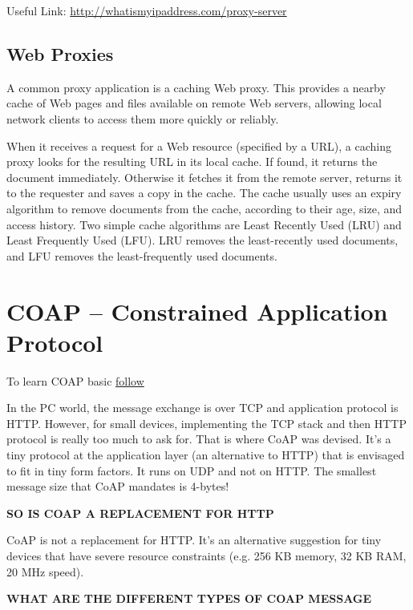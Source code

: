 \documentclass[letterpaper,10pt,english]{sphinxmanual}
\begin{document}
Useful Link: \href{http://whatismyipaddress.com/proxy-server}{http://whatismyipaddress.com/proxy-server}


\subsection{Web Proxies}
\label{week-10:web-proxies}
A common proxy application is a caching Web proxy. This provides a nearby cache of Web pages and files available on remote Web servers, allowing local network clients to access them more quickly or reliably.

When it receives a request for a Web resource (specified by a URL), a caching proxy looks for the resulting URL in its local cache. If found, it returns the document immediately. Otherwise it fetches it from the remote server, returns it to the requester and saves a copy in the cache. The cache usually uses an expiry algorithm to remove documents from the cache, according to their age, size, and access history. Two simple cache algorithms are Least Recently Used (LRU) and Least Frequently Used (LFU). LRU removes the least-recently used documents, and LFU removes the least-frequently used documents.


\section{COAP – Constrained Application Protocol}
\label{week-10:coap-constrained-application-protocol}
To learn COAP basic \href{http://www.coapsharp.com/basics-of-coap/}{follow}

In the PC world, the message exchange is over TCP and application protocol is HTTP. However, for small devices, implementing the TCP stack and then HTTP protocol is really too much to ask for. That is where CoAP was devised. It’s a tiny protocol at the application layer (an alternative to HTTP) that is envisaged to fit in tiny form factors. It runs on UDP and not on HTTP. The smallest message size that CoAP mandates is 4-bytes!

\textbf{SO IS COAP A REPLACEMENT FOR HTTP}

CoAP is not a replacement for HTTP. It’s an alternative suggestion for tiny devices that have severe resource constraints (e.g. 256 KB memory, 32 KB RAM, 20 MHz speed).

\textbf{WHAT ARE THE DIFFERENT TYPES OF COAP MESSAGE}
\end{document}
